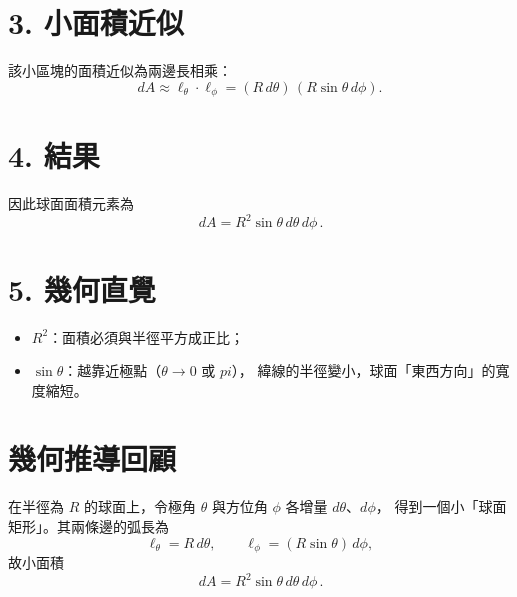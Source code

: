 \documentclass{article}
\def\pi{pi}%
\begin{document}
\section*{3. 小面積近似}
該小區塊的面積近似為兩邊長相乘：
\[
dA \approx \ell_\theta \cdot \ell_\phi
= (R\, d\theta)\,(R\sin\theta\, d\phi).
\]

\section*{4. 結果}
因此球面面積元素為
\[
\boxed{\,dA = R^2 \sin\theta \, d\theta \, d\phi\, }.
\]

\section*{5. 幾何直覺}
\begin{itemize}
  \item $R^2$：面積必須與半徑平方成正比；
  \item $\sin\theta$：越靠近極點（$\theta\to 0$ 或 $\pi$），
  緯線的半徑變小，球面「東西方向」的寬度縮短。
\end{itemize}
\section*{幾何推導回顧}
在半徑為 $R$ 的球面上，令極角 $\theta$ 與方位角 $\phi$ 各增量 $d\theta$、$d\phi$，
得到一個小「球面矩形」。其兩條邊的弧長為
\[
\ell_\theta = R\,d\theta,\qquad
\ell_\phi = (R\sin\theta)\,d\phi,
\]
故小面積
\[
\boxed{\,dA = R^2 \sin\theta\, d\theta\, d\phi\, }.
\]
\end{document}
